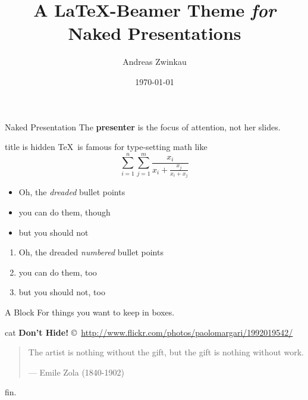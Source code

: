 \documentclass[english,german]{beamer}
\title{A \LaTeX-Beamer Theme {\itshape for} Naked Presentations}
\date{\today}
\author{Andreas Zwinkau}
\begin{document}
\titlepage

\begin{defnframe}{Naked Presentation}
The \textbf{presenter} is the focus of attention,
not her slides.
\end{defnframe}

\begin{frame}{title is hidden}
\TeX\ is famous for type-setting math like \[
   \sum_{i=1}^{n}\sum_{j=1}^{m} 
   \frac{x_i}{x_i + \frac{x_j}{x_i+x_j}}
\]
\end{frame}

\begin{frame}
\begin{itemize}
   \item Oh, the {\itshape dreaded} bullet points
   \item you can do them, though
   \item but you should not
\end{itemize}
\end{frame}

\begin{frame}
\begin{enumerate}
   \item Oh, the dreaded \emph{numbered} bullet points
   \item you can do them, too
   \item but you should not, too
\end{enumerate}
\end{frame}

\begin{frame}
\begin{block}{A Block}
   For things you want to keep in boxes.
\end{block}
\end{frame}

\begin{imageframe}{cat}
   \color{black}
   {\bf\Large Don't Hide!}
   \vskip6.5cm
   \hfill {\tiny\copyright~\url{http://www.flickr.com/photos/paolomargari/1992019542/}}
\end{imageframe}

\begin{frame}
\begin{quote}
   The artist is nothing without the gift, but the gift is nothing without work.

   \hfill--- Emile Zola (1840-1902)
\end{quote}
\end{frame}

\emptyslide

\begin{wordframe}
fin.
\end{wordframe}
\end{document}
